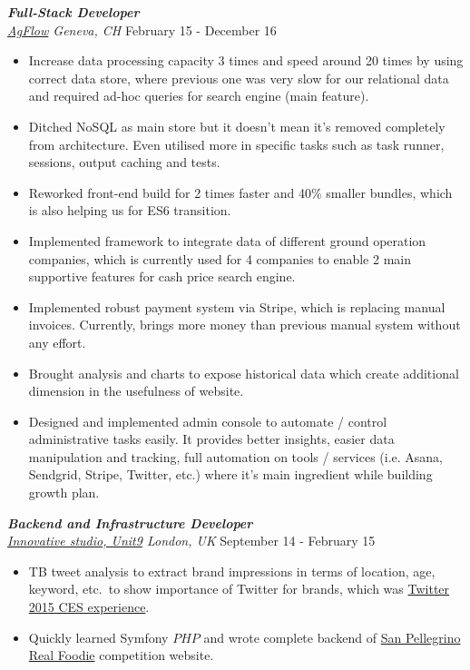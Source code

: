 \documentclass[line, margin]{res}
\begin{document}
\begin{resume}
{\sl \textbf{Full-Stack Developer} \\ \href{http://www.agflow.com}{AgFlow} Geneva, CH} \hfill February 15 - December 16 \\
\vspace{-0.3cm}
\begin{itemize}
  \item Increase data processing capacity 3 times and speed around 20 times by using correct data store, where previous one was very slow for our relational data and required ad-hoc queries for search engine (main feature).
  \item Ditched NoSQL as main store but it doesn't mean it's removed completely from architecture. Even utilised more in specific tasks such as task runner, sessions, output caching and tests.
  \item Reworked front-end build for 2 times faster and 40\% smaller bundles, which is also helping us for ES6 transition.
  \item Implemented framework to integrate data of different ground operation companies, which is currently used for 4 companies to enable 2 main supportive features for cash price search engine.
  \item Implemented robust payment system via Stripe, which is replacing manual invoices. Currently, brings more money than previous manual system without any effort.
  \item Brought analysis and charts to expose historical data which create additional dimension in the usefulness of website.
  \item Designed and implemented admin console to automate / control administrative tasks easily. It provides better insights, easier data manipulation and tracking, full automation on tools / services  (i.e. Asana, Sendgrid, Stripe, Twitter, etc.) where it's main ingredient while building growth plan.
\end{itemize}

{\sl \textbf{Backend and Infrastructure Developer} \\ \href{http://www.unit9.com/}{Innovative studio, Unit9} London, UK} \hfill September 14 - February 15 \\
\vspace{-0.3cm}
\begin{itemize}
  \item {} TB tweet analysis to extract brand impressions in terms of location, age, keyword, etc.\ to show importance of Twitter for brands, which was \href{http://www.unit9.com/innovation/twitter-ces-experience}{Twitter 2015 CES experience}.
  \item Quickly learned Symfony \(PHP\) and wrote complete backend of \href{https://realfoodie.sanpellegrino.com/}{San Pellegrino Real Foodie} competition website.
\end{itemize}


\end{resume}
\end{document}
